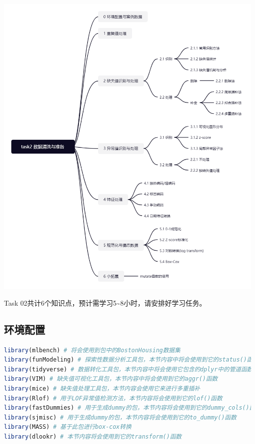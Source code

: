 \documentclass[]{ctexbook}
\begin{document}
\includegraphics[width=1\textwidth,height=\textheight]{./image/task02_structure.jpg}

Task 02共计6个知识点，预计需学习5\textasciitilde8小时，请安排好学习任务。

\hypertarget{ux73afux5883ux914dux7f6e-1}{%
\subsection*{环境配置}\label{ux73afux5883ux914dux7f6e-1}}


\begin{lstlisting}[language=R]
library(mlbench) # 将会使用到包中的BostonHousing数据集
library(funModeling) # 探索性数据分析工具包，本节内容中将会使用到它的status()函数，打印整体数据质量
library(tidyverse) # 数据转化工具包，本节内容中将会使用它包含的dplyr中的管道函数 %>%
library(VIM) # 缺失值可视化工具包，本节内容中将会使用到它的aggr()函数
library(mice) # 缺失值处理工具包，本节内容会使用它来进行多重插补
library(Rlof) # 用于LOF异常值检测方法，本节内容将会使用到它的lof()函数
library(fastDummies) # 用于生成dummy的包，本节内容将会使用到它的dummy_cols()函数
library(sjmisc) # 用于生成dummy的包，本节内容将会使用到它的to_dummy()函数
library(MASS) # 基于此包进行box-cox转换
library(dlookr) # 本节内容将会使用到它的transform()函数
\end{lstlisting}
\end{document}
